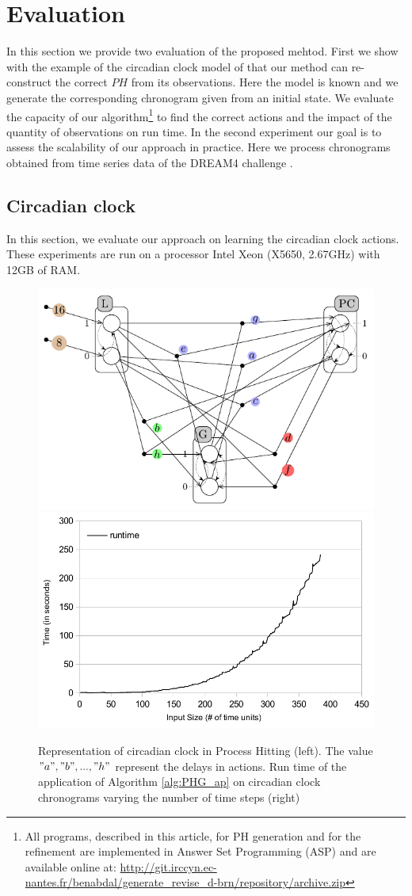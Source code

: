 \section{Evaluation}

In this section we provide two evaluation of the proposed mehtod.
First we show with the example of the circadian clock model of \cite{comet2012simplified} that our method can re-construct the correct $PH$ from its observations.
Here the model is known and we generate the corresponding chronogram given from an initial state.
We evaluate the capacity of our algorithm\footnote{All programs, described in this article, for PH generation and for the refinement are implemented in Answer Set Programming (ASP) and are available online at: \url{http://git.irccyn.ec-nantes.fr/benabdal/generate_revise_d-brn/repository/archive.zip}} to find the correct actions and the impact of the quantity of observations on run time.
In the second experiment our goal is to assess the scalability of our approach in practice.
Here we process chronograms obtained from time series data of the DREAM4 challenge \cite{prill2011crowdsourcing}.

\label{sec:evaluation}
\subsection{Circadian clock}

In this section, we evaluate our approach on learning the circadian clock actions.
These experiments are run on a processor Intel Xeon (X5650, 2.67GHz) with 12GB of RAM.

	\begin{figure}[htb!]\centering
	\includegraphics[width=0.45\linewidth]{images/circadianPH.pdf}
	\hspace{0.1cm}
	\includegraphics[width=0.45\linewidth]{images/circadian_run_time}
	\label{fig:PH_circadian}
	\caption{Representation of circadian clock in Process Hitting (left). The value $"a", "b", ..., "h"$ represent the delays in actions.
	Run time of the application of Algorithm \ref{alg:PHG_ap} on circadian clock chronograms varying the number of time steps (right)}
	
	\label{fig:run_time}	
	\end{figure}
%

